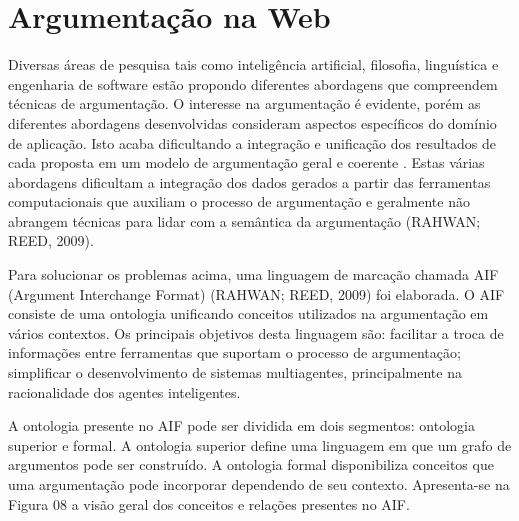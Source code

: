 \section{Argumentação na Web}

Diversas áreas de pesquisa tais como inteligência artificial, filosofia, linguística e engenharia de software estão propondo diferentes abordagens que compreendem técnicas de argumentação. O interesse na argumentação é evidente, porém as diferentes abordagens desenvolvidas consideram aspectos específicos do domínio de aplicação. Isto acaba dificultando a integração e unificação dos resultados de cada proposta em um modelo de argumentação geral e coerente \cite{bex_formal_2010}. Estas várias abordagens dificultam a integração dos dados gerados a partir das  ferramentas computacionais que auxiliam o processo de argumentação e geralmente não abrangem técnicas para lidar com a semântica da argumentação (RAHWAN; REED, 2009).  

	Para solucionar os problemas acima, uma linguagem de marcação chamada AIF (Argument Interchange Format) (RAHWAN; REED, 2009) foi elaborada. O AIF consiste de uma ontologia unificando conceitos utilizados na argumentação em vários contextos. Os principais objetivos desta linguagem são: facilitar a troca de informações entre ferramentas que suportam o processo de argumentação; simplificar o desenvolvimento de sistemas multiagentes, principalmente na racionalidade dos agentes inteligentes. 
	
	A ontologia presente no AIF pode ser dividida em dois segmentos:  ontologia superior e formal. A ontologia superior define uma linguagem em que um grafo de argumentos pode ser construído. A ontologia formal disponibiliza conceitos que uma argumentação pode incorporar dependendo de seu contexto. Apresenta-se na Figura 08 a visão geral dos conceitos e relações presentes no AIF. 
